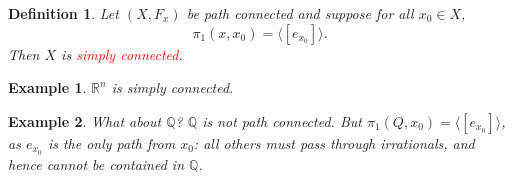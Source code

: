 \documentclass[12pt,letterpaper,boxed]{article}
\newtheorem*{example}{Example}
\newtheorem*{defn}{Definition}
\newcommand{\R}{\mathbb{R}}
\newcommand{\Q}{\mathbb{Q}}
\begin{document}
\begin{defn}  Let $(X,F_x)$ be path connected and suppose for all $x_0\in X$, $$\pi_1(x,x_0)=\langle [e_{x_0}]\rangle.$$ Then $X$ is \emph{\textcolor{red}{simply connected}}.
\end{defn}

\begin{example} $\R^n$ is simply connected.
\end{example}
\begin{example} What about $\Q$?  $\Q$ is \emph{not} path connected.  But $\pi_1(Q,x_0)=\langle [e_{x_0}]\rangle $, as $e_{x_0}$ is the only path from $x_0$: all others must pass through irrationals, and hence cannot be contained in $\Q$.
\end{example}
\end{document}
